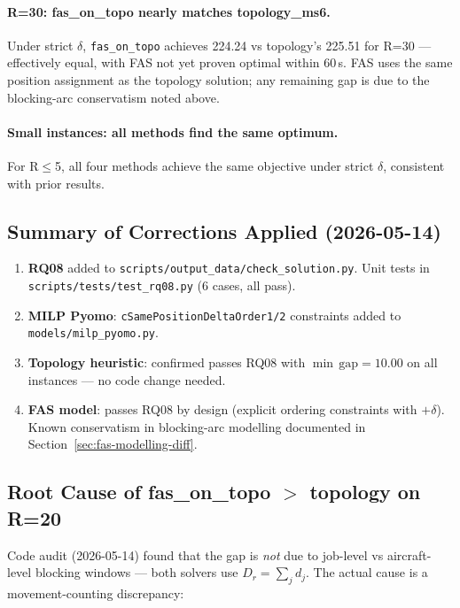 \paragraph{R=30: fas\_on\_topo nearly matches topology\_ms6.}

Under strict $\delta$, \texttt{fas\_on\_topo} achieves 224.24 vs
topology's 225.51 for R=30 — effectively equal, with FAS not yet proven
optimal within 60\,s.  FAS uses the same position assignment as the
topology solution; any remaining gap is due to the blocking-arc conservatism
noted above.

\paragraph{Small instances: all methods find the same optimum.}

For R$\leq$5, all four methods achieve the same objective under strict $\delta$,
consistent with prior results.

\subsection{Summary of Corrections Applied (2026-05-14)}

\begin{enumerate}[noitemsep]
    \item \textbf{RQ08} added to \texttt{scripts/output\_data/check\_solution.py}.
          Unit tests in \texttt{scripts/tests/test\_rq08.py} (6 cases, all pass).
    \item \textbf{MILP Pyomo}: \texttt{cSamePositionDeltaOrder1/2} constraints
          added to \texttt{models/milp\_pyomo.py}.
    \item \textbf{Topology heuristic}: confirmed passes RQ08 with
          $\min\,\text{gap} = 10.00$ on all instances — no code change needed.
    \item \textbf{FAS model}: passes RQ08 by design (explicit ordering constraints
          with $+\delta$).  Known conservatism in blocking-arc modelling documented
          in Section~\ref{sec:fas-modelling-diff}.
\end{enumerate}

\subsection{Root Cause of fas\_on\_topo $>$ topology on R=20}
\label{exp:exp04-fas-gap}

Code audit (2026-05-14) found that the gap is \emph{not} due to job-level vs
aircraft-level blocking windows — both solvers use $D_r = \sum_j d_j$.
The actual cause is a movement-counting discrepancy:

